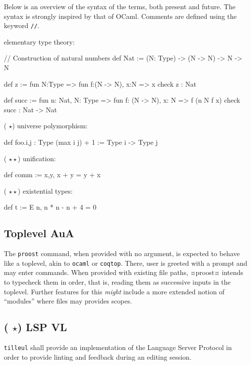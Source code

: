 \documentclass[twocolumn]{article}
\newcommand{\members}[1]{\texorpdfstring{\hfill\scriptsize #1}{}}
\newcommand{\etun}{({\color{Green} $\star$}) }
\newcommand{\etde}{({\color{Orange} $\star\star$}) }
\begin{document}
Below is an overview of the syntax of the terms, both present and future. The
syntax is strongly inspired by that of OCaml. Comments are defined using the
keyword \texttt{//}.

\vspace{1.2mm}
elementary type theory:
\begin{proost}
// Construction of natural numbers
def Nat :=
  (N: Type) -> (N -> N) -> N -> N

def z := fun N:Type =>
  fun f:(N -> N), x:N => x
check z : Nat

def succ := fun n: Nat, N: Type =>
  fun f: (N -> N), x: N => f (n N f x)
check succ : Nat -> Nat
\end{proost}

\etun universe polymorphism:
\begin{proost}
def foo.{i,j} : Type (max i j) + 1
:= Type i -> Type j
\end{proost}

\etde unification:
\begin{proost}
def comm := \/ x,y, x + y = y + x
\end{proost}

\etde existential types:
\begin{proost}
def t := E n, n * n - n + 4 = 0
\end{proost}


\subsection{Toplevel  \members{AuA}} The \texttt{proost} command, when provided
with no argument, is expected to behave like a toplevel, akin to \texttt{ocaml}
or \texttt{coqtop}. There, user is greeted with a prompt and may enter commands.
When provided with existing file paths, ¤proost¤ intends to typecheck them in
order, that is, reading them as successive inputs in the toplevel. Further
features for this \emph{might} include a more extended notion of ``modules''
where files may provides scopes. { \begin{center}
 \end{center} }


\subsection{\etun LSP \members{VL}}
\texttt{tilleul} shall provide an
implementation of the Language Server Protocol in order to provide linting and
feedback during an editing session.
\end{document}
